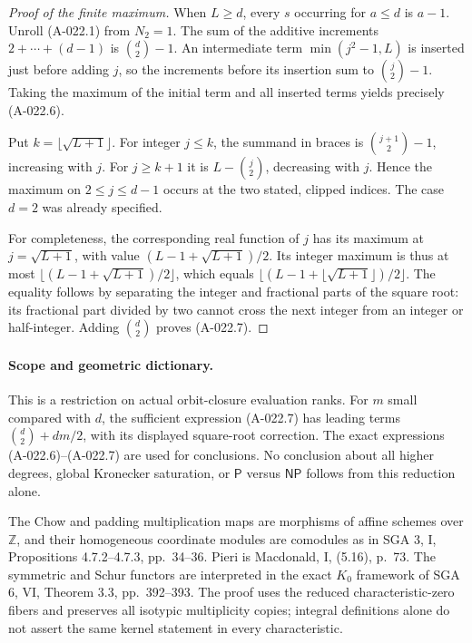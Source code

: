 \begin{proof}[Proof of the finite maximum]
When $L\geq d$, every $s$ occurring for $a\leq d$ is $a-1$.
Unroll (A-022.1) from $N_2=1$. The sum of the additive
increments $2+\cdots+(d-1)$ is $\binom d2-1$.
An intermediate term $\min(j^2-1,L)$ is inserted just
before adding $j$, so the increments before its insertion
sum to $\binom j2-1$. Taking the maximum of the initial
term and all inserted terms yields precisely (A-022.6).

Put $k=\lfloor\sqrt{L+1}\rfloor$. For integer $j\leq k$,
the summand in braces is $\binom{j+1}{2}-1$, increasing
with $j$. For $j\geq k+1$ it is $L-\binom j2$, decreasing
with $j$. Hence the maximum on $2\leq j\leq d-1$ occurs
at the two stated, clipped indices. The case $d=2$ was
already specified.

For completeness, the corresponding real function of $j$
has its maximum at $j=\sqrt{L+1}$, with value
$(L-1+\sqrt{L+1})/2$. Its integer maximum is thus at most
$\lfloor(L-1+\sqrt{L+1})/2\rfloor$, which equals
$\lfloor(L-1+\lfloor\sqrt{L+1}\rfloor)/2\rfloor$.
The equality follows by separating the integer and fractional
parts of the square root: its fractional part divided by two
cannot cross the next integer from an integer or half-integer.
Adding $\binom d2$ proves (A-022.7).
\end{proof}

\paragraph{Scope and geometric dictionary.}
This is a restriction on actual orbit-closure evaluation ranks.
For $m$ small compared with $d$, the sufficient expression
(A-022.7) has leading terms $\binom d2+dm/2$, with its
displayed square-root correction. The exact expressions (A-022.6)--(A-022.7)
are used for conclusions. No conclusion about all higher
degrees, global Kronecker saturation, or $\mathsf P$ versus
$\mathsf{NP}$ follows from this reduction alone.

The Chow and padding multiplication maps are morphisms of
affine schemes over $\mathbb Z$, and their homogeneous
coordinate modules are comodules as in SGA 3, I,
Propositions 4.7.2--4.7.3, pp.~34--36. Pieri is Macdonald,
I, (5.16), p.~73. The symmetric and Schur functors are
interpreted in the exact $K_0$ framework of SGA 6, VI,
Theorem 3.3, pp.~392--393. The proof uses the reduced
characteristic-zero fibers and preserves all isotypic
multiplicity copies; integral definitions alone do not
assert the same kernel statement in every characteristic.
